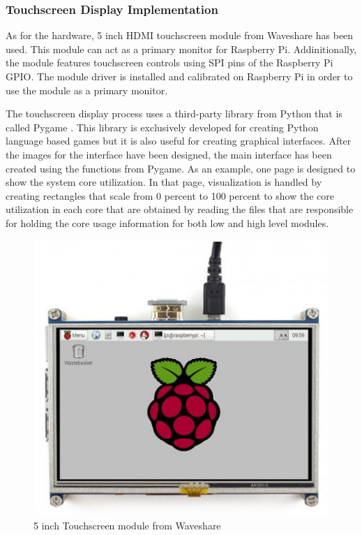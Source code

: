 \subsubsection{Touchscreen Display Implementation}
As for the hardware, 5 inch HDMI touchscreen module from Waveshare has been used. This module can act as a primary monitor for Raspberry Pi. Addinitionally, the module features touchscreen controls using SPI pins of the Raspberry Pi GPIO. The module driver is installed and calibrated on Raspberry Pi in order to use the module as a primary monitor. 

The touchscreen display process uses a third-party library from Python that is called Pygame \cite{pygame}. This library is exclusively developed for creating Python language based games but it is also useful for creating graphical interfaces. After the images for the interface have been designed, the main interface has been created using the functions from Pygame. As an example, one page is designed to show the system core utilization. In that page, visualization is handled by creating rectangles that scale from 0 percent to 100 percent to show the core utilization in each core that are obtained by reading the files that are responsible for holding the core usage information for both low and high level modules.
\begin{figure}[!ht]
	\centering
	\captionsetup{justification=centering}
	\includegraphics[scale=0.6]{content/images/touschreen5inc.jpg}
	\caption{5 inch Touchscreen module from Waveshare}
	\label{fig:touschreen5inc}
\end{figure}

